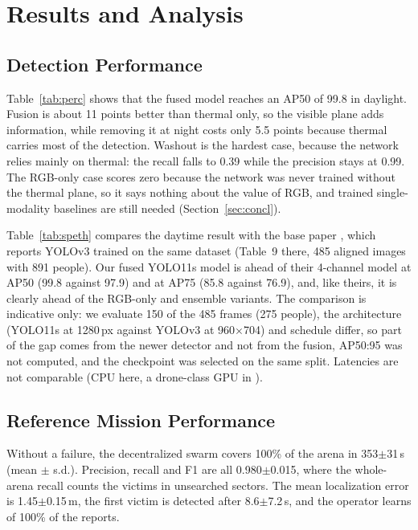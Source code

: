 \documentclass[conference]{IEEEtran}
\newcommand{\pmsd}[2]{#1{\scriptsize$\pm$#2}}
\begin{document}
\section{Results and Analysis}\label{sec:results}
\subsection{Detection Performance}
Table~\ref{tab:perc} shows that the fused model reaches an AP50 of 99.8 in daylight. Fusion is about 11 points better than thermal only, so the visible plane adds information, while removing it at night costs only 5.5 points because thermal carries most of the detection. Washout is the hardest case, because the network relies mainly on thermal: the recall falls to 0.39 while the precision stays at 0.99. The RGB-only case scores zero because the network was never trained without the thermal plane, so it says nothing about the value of RGB, and trained single-modality baselines are still needed (Section~\ref{sec:concl}).

Table~\ref{tab:speth} compares the daytime result with the base paper \cite{speth2022}, which reports YOLOv3 trained on the same dataset (Table~9 there, 485 aligned images with 891 people). Our fused YOLO11s model is ahead of their 4-channel model at AP50 (99.8 against 97.9) and at AP75 (85.8 against 76.9), and, like theirs, it is clearly ahead of the RGB-only and ensemble variants. The comparison is indicative only: we evaluate 150 of the 485 frames (275 people), the architecture (YOLO11s at 1280\,px against YOLOv3 at 960$\times$704) and schedule differ, so part of the gap comes from the newer detector and not from the fusion, AP50:95 was not computed, and the checkpoint was selected on the same split. Latencies are not comparable (CPU here, a drone-class GPU in \cite{speth2022}).





\subsection{Reference Mission Performance}
Without a failure, the decentralized swarm covers 100\% of the arena in \pmsd{353}{31}\,s (mean $\pm$ s.d.). Precision, recall and F1 are all \pmsd{0.980}{0.015}, where the whole-arena recall counts the victims in unsearched sectors. The mean localization error is \pmsd{1.45}{0.15}\,m, the first victim is detected after \pmsd{8.6}{7.2}\,s, and the operator learns of 100\% of the reports.
\end{document}
